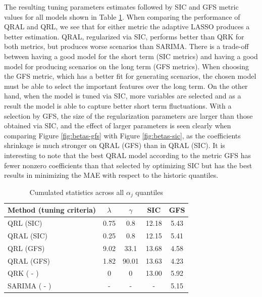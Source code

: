 The resulting tuning parameters estimates followed by SIC and GFS metric values for all models shown in Table \ref{tab:results-icaraizinho}. When comparing the performance  of QRAL and QRL, we see that for either metric the adaptive LASSO produces a better estimation. 
QRAL, regularized via SIC, performs better than QRK for both metrics, but produces worse scenarios than SARIMA. There is a trade-off between having a good model for the short term (SIC metrics) and having a good model for producing scenarios on the long term (GFS metrics). 
When choosing the GFS metric, which has a better fit for generating scenarios, the chosen model must be able to select the important features over the long term. On the other hand, when the model is tuned via SIC, more variables are selected and as a result the model is able to capture better short term fluctuations.
With a selection by GFS, the size of the regularization parameters are larger than those obtained via SIC, and the effect of larger parameters is seen clearly when comparing Figure \ref{fig:betas-gfs} with Figure \ref{fig:betas-sic}, as the coefficients shrinkage is much stronger on QRAL (GFS) than in QRAL (SIC). It is interesting to note that the best QRAL model according to the metric GFS has fewer nonzero coefficients than that selected by optimizing SIC but has the best results in minimizing the MAE with respect to the historic quantiles.  
\begin{table}[ht]
	\centering
	\caption{Cumulated statistics across all $\alpha_j$ quantiles}
	\label{tab:results-icaraizinho}
	\begin{tabular}{|l|c|c|c|c|}
		\hline 
		Method (tuning criteria) & $\lambda$ & $\gamma$ & SIC & GFS\tabularnewline
		\hline 
		\hline 
		QRL   (SIC) & 0.75 & 0.8 & 12.18 & 5.43\tabularnewline
		\hline 
		QRAL   (SIC) & 0.25 & 0.8 & 12.15 & 5.41\tabularnewline
		\hline 
		QRL    (GFS) & 9.02 & 33.1 & 13.68 & 4.58\tabularnewline
		\hline 
		QRAL   (GFS) & 1.82 & 90.01 & 13.63 & 4.23\tabularnewline
		\hline 
		QRK    ( - ) & 0 & 0 & 13.00 & 5.92 \tabularnewline
		\hline 
		SARIMA ( - ) & - & - & - & 5.15 \tabularnewline
		\hline 	
	\end{tabular}
	\end{table}
	


